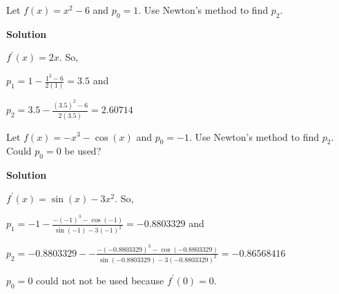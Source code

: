 

\maketitle

\pagebreak

\begin{homeworkProblem}
    Let $f(x) = x^2 - 6$ and $p_0 = 1$. Use Newton's method to find $p_2$.\newline

    \textbf{Solution}\newline

    $f^{\prime}(x) = 2x$. So,\newline

    $p_1 = 1 - \frac{1^2 - 6}{2(1)} = 3.5$ and \newline

    $p_2 = 3.5 - \frac{(3.5)^2 - 6}{2(3.5)} = 2.60714$
\end{homeworkProblem}

\begin{homeworkProblem}
    Let $f(x) = -x^3 - \cos (x)$ and $p_0 = -1$. Use Newton's method to find $p_2$.
    Could $p_0 = 0$ be used?\newline

    \textbf{Solution}\newline

    $f^{\prime}(x) = \sin (x) - 3x^2$. So,\newline

    $p_1 = -1 - \frac{-(-1)^3 - \cos (-1)}{\sin (-1) - 3(-1)^2} = -0.8803329$ and \newline

    $p_2 = -0.8803329 - - \frac{-(-0.8803329)^3 - \cos (-0.8803329)}{\sin (-0.8803329) - 3(-0.8803329)^2} = -0.86568416$\newline

    $p_0 = 0$ could not not be used because $f^{\prime}(0) = 0$.
\end{homeworkProblem}

